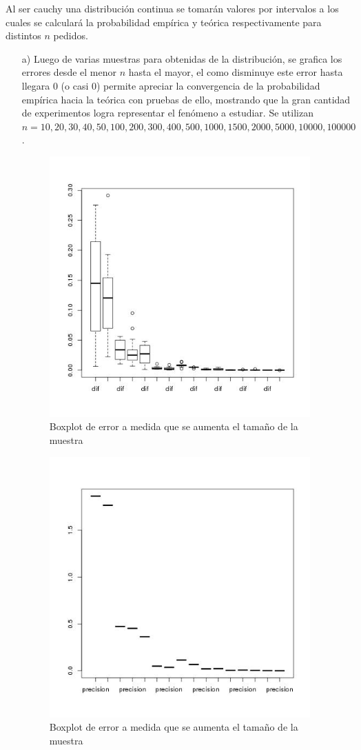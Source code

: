 \documentclass[letter,10pt]{article}
\begin{document}
Al ser cauchy una distribución continua se tomarán valores por intervalos a los cuales se calculará la probabilidad
empírica y teórica respectivamente para distintos $n$ pedidos.
\begin{itemize}
 \item[a)] 
      Luego de varias muestras para obtenidas de la distribución, se grafica los errores desde el menor $n$ hasta el mayor, el como
      disminuye este error hasta llegara 0 (o casi 0) permite apreciar la convergencia de la probabilidad empírica hacia la teórica con pruebas
      de ello, mostrando que la gran cantidad de experimentos logra representar el fenómeno a estudiar. Se utilizan $n=10,20,30,40,50,100,200,300,400,500,1000,1500,2000,5000,10000,100000$.
     
      \begin{figure}[H]
	      \centering
              \includegraphics[width=100mm, scale=0.3]{p5a_boxplot_dif.jpg}
              \caption{Boxplot de error a medida que se aumenta el tamaño de la muestra}
          \end{figure}


      \begin{figure}[H]
        \centering
              \includegraphics[width=100mm, scale=0.3]{p5a_boxplot_conv.jpg}
              \caption{Boxplot de error a medida que se aumenta el tamaño de la muestra}
          \end{figure}



\end{itemize}
\end{document}
